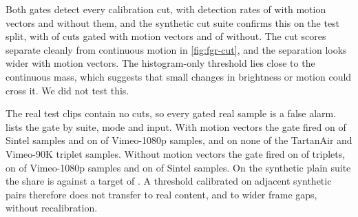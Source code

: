 \Preliminary{} Both gates detect every calibration cut, with detection rates of  with motion vectors and  without them, and the synthetic cut suite confirms this on the test split, with  of  cuts gated with motion vectors and  of  without. \Observation{} The cut scores separate cleanly from continuous motion in \cref{fig:fgr-cut}, and the separation looks wider with motion vectors. The histogram-only threshold lies close to the continuous mass, which suggests that small changes in brightness or motion could cross it. We did not test this.

The real test clips contain no cuts, so every gated real sample is a false alarm.  lists the gate by suite, mode and input. \UnderRevision{} With motion vectors the gate fired on  of  Sintel samples and on  of  Vimeo-1080p samples, and on none of the TartanAir and Vimeo-90K triplet samples. Without motion vectors the gate fired on  of  triplets, on  of  Vimeo-1080p samples and on  of  Sintel samples. On the synthetic plain suite the share is  against a target of . A threshold calibrated on adjacent synthetic pairs therefore does not transfer to real content, and to wider frame gaps, without recalibration.

